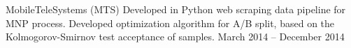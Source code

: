 \documentclass[10pt,a4paper]{altacv}
\begin{document}
\divider

    {MobileTeleSystems (MTS)}
    {
    Developed in Python web scraping data pipeline for MNP process. \linebreak
    Developed optimization algorithm for A/B split, based on the Kolmogorov-Smirnov test acceptance of samples. 
    }
    {March 2014 -- December 2014} 
{}


\clearpage
\end{document}
